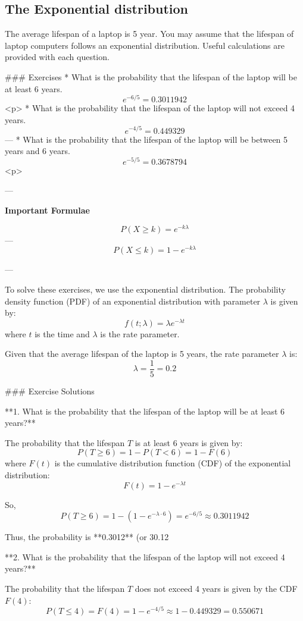 
\subsection*{The Exponential distribution}
The average lifespan of a laptop is 5 year. You may assume that the lifespan of laptop computers follows an exponential distribution. Useful calculations are provided with each question.

### Exercises 
*  What is the probability that the lifespan of the laptop will be at least 6 years.
	$$e^{-6/5} = 0.3011942$$
<p>
*  What is the probability that the lifespan of the laptop will not exceed 4 years.
	$$e^{-4/5} = 0.449329$$
	---
*  What is the probability that the lifespan of the laptop will be between 5 years and 6 years.
	$$e^{-5/5} = 0.3678794$$
<p>

---


 \textbf{Important Formulae}

$$
P( X \geq k) = e^{-k \lambda }$$
---
$$
P( X \leq k) = 1 -e^{-k\lambda }$$

---

To solve these exercises, we use the exponential distribution. The probability density function (PDF) of an exponential distribution with parameter $\lambda$ is given by:
$$f(t; \lambda) = \lambda e^{-\lambda t}$$
where $ t $ is the time and $ \lambda $ is the rate parameter.

Given that the average lifespan of the laptop is 5 years, the rate parameter $\lambda$ is:
$$\lambda = \frac{1}{5} = 0.2$$

### Exercise Solutions

**1. What is the probability that the lifespan of the laptop will be at least 6 years?**

The probability that the lifespan $ T $ is at least 6 years is given by:
$$P(T \geq 6) = 1 - P(T < 6) = 1 - F(6)$$
where $ F(t) $ is the cumulative distribution function (CDF) of the exponential distribution:
$$F(t) = 1 - e^{-\lambda t}$$

So,
$$P(T \geq 6) = 1 - (1 - e^{-\lambda \cdot 6}) = e^{-6/5} \approx 0.3011942$$

Thus, the probability is **0.3012** (or 30.12%

**2. What is the probability that the lifespan of the laptop will not exceed 4 years?**

The probability that the lifespan $ T $ does not exceed 4 years is given by the CDF $ F(4) $:
$$P(T \leq 4) = F(4) = 1 - e^{-4/5} \approx 1 - 0.449329 = 0.550671$$

